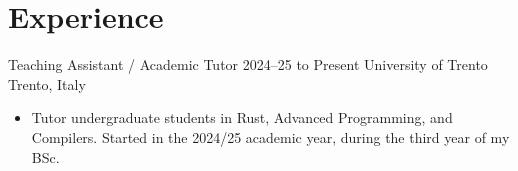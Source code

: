 \section{Experience}

\cvexperience
  {Teaching Assistant / Academic Tutor}
  {2024--25 to Present}
  {University of Trento}
  {Trento, Italy}
  {
    \begin{itemize}
      \item Tutor undergraduate students in Rust, Advanced Programming, and Compilers. Started in the 2024/25 academic year, during the third year of my BSc.
    \end{itemize}
  }

